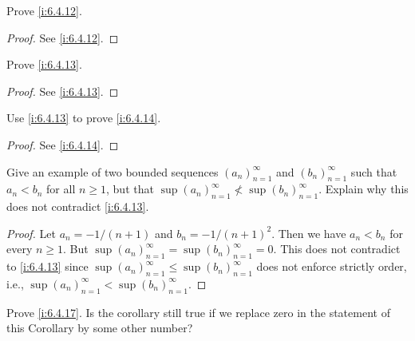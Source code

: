 \begin{ex}\label{i:ex:6.4.3}
  Prove \cref{i:6.4.12}.
\end{ex}

\begin{proof}
  See \cref{i:6.4.12}.
\end{proof}

\begin{ex}\label{i:ex:6.4.4}
  Prove \cref{i:6.4.13}.
\end{ex}

\begin{proof}
  See \cref{i:6.4.13}.
\end{proof}

\begin{ex}\label{i:ex:6.4.5}
  Use \cref{i:6.4.13} to prove \cref{i:6.4.14}.
\end{ex}

\begin{proof}
  See \cref{i:6.4.14}.
\end{proof}

\begin{ex}\label{i:ex:6.4.6}
  Give an example of two bounded sequences \((a_n)_{n = 1}^\infty\) and \((b_n)_{n = 1}^\infty\) such that \(a_n < b_n\) for all \(n \geq 1\), but that \(\sup(a_n)_{n = 1}^\infty \not< \sup(b_n)_{n = 1}^\infty\).
  Explain why this does not contradict \cref{i:6.4.13}.
\end{ex}

\begin{proof}
  Let \(a_n = -1 / (n + 1)\) and \(b_n = -1 / (n + 1)^2\).
  Then we have \(a_n < b_n\) for every \(n \geq 1\).
  But \(\sup(a_n)_{n = 1}^\infty = \sup(b_n)_{n = 1}^\infty = 0\).
  This does not contradict to \cref{i:6.4.13} since \(\sup(a_n)_{n = 1}^\infty \leq \sup(b_n)_{n = 1}^\infty\) does not enforce strictly order, i.e., \(\sup(a_n)_{n = 1}^\infty < \sup(b_n)_{n = 1}^\infty\).
\end{proof}

\begin{ex}\label{i:ex:6.4.7}
  Prove \cref{i:6.4.17}.
  Is the corollary still true if we replace zero in the statement of this Corollary by some other number?
\end{ex}

